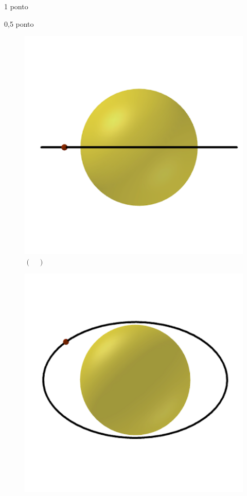\documentclass{../lista}
\begin{document}
\begin{questao}{1 ponto}
\begin{pergunta}{0,5 ponto}
			\begin{multicols}{3}
				\begin{figure}[H]
					\centering
					\includegraphics[scale=0.2]{./img/5b1.png}
					\captionsetup{labelformat=empty}
					\caption{$(\quad)$}
				\end{figure}
				\begin{figure}[H]
					\centering
					\includegraphics[scale=0.2]{./img/5b2.png}

\end{figure}
\end{multicols}
\end{pergunta}
\end{questao}
\end{document}
